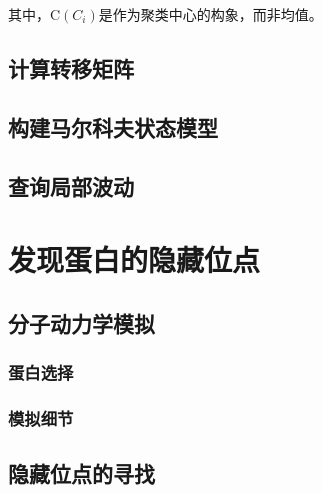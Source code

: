 \documentclass[a4paper]{article}
\begin{document}
\begin{CJK}{UTF8}{gbsn}
其中，$\mathrm C(C_{i})$是作为聚类中心的构象，而非均值。


	\subsection{计算转移矩阵}
	\subsection{构建马尔科夫状态模型}
	\subsection{查询局部波动}

\section{发现蛋白的隐藏位点}
	\subsection{分子动力学模拟}
		\subsubsection{蛋白选择}
		\subsubsection{模拟细节}
	\subsection{隐藏位点的寻找}




\end{CJK}
\end{document}

